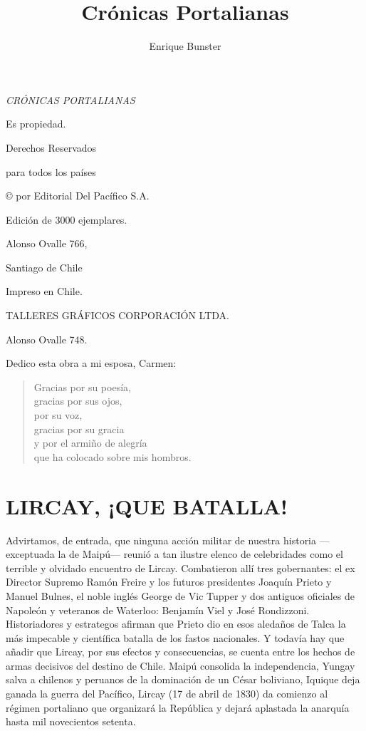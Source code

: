 \documentclass[10pt,twoside,openright]{memoir}
\title{Crónicas Portalianas}
\author{Enrique Bunster}
\makeatletter
\def\maketitle{%
	\null
	\thispagestyle{empty}%
	\vfill
	\begin{center}\leavevmode
		\normalfont
		{\LARGE\raggedleft \@author\par}%
		\hrulefill\par
		{\huge\raggedright \@title\par}%
		\vskip 1cm
	\end{center}%
	\vfill
	\null
	\cleardoublepage
}
\makeatother
\begin{document}
\let\cleardoublepage\clearpage

\maketitle

\frontmatter
\null\vfill
\begin{flushleft}
	\textit{CRÓNICAS PORTALIANAS}
	
	Es propiedad.
	
	Derechos Reservados
	
	para todos los países
	
	© por Editorial Del Pacífico S.A.

	Edición de 3000 ejemplares.
	
	Alonso Ovalle 766,
	
	Santiago de Chile	

	\bigskip
	
	
	Impreso en Chile.
	
	TALLERES GRÁFICOS CORPORACIÓN LTDA.
	
	Alonso Ovalle 748.
	
	
	
	
\end{flushleft}
\let\cleardoublepage\clearpage

\mainmatter
\sloppy


	
Dedico esta obra a mi esposa, Carmen:

\begin{verse}
Gracias por su poesía,\\
gracias por sus ojos,\\
por su voz,\\
gracias por su gracia\\
y por el armiño de alegría\\
que ha colocado sobre mis hombros.
\end{verse}

\chapter{LIRCAY, ¡QUE BATALLA!}

Advirtamos, de entrada, que ninguna acción militar de nuestra historia
---exceptuada la de Maipú--- reunió a tan ilustre elenco de celebridades
como el terrible y olvidado encuentro de Lircay. Combatieron allí tres
gobernantes: el ex Director Supremo Ramón Freire y los futuros
presidentes Joaquín Prieto y Manuel Bulnes, el noble inglés George de
Vic Tupper y dos antiguos oficiales de Napoleón y veteranos de Waterloo:
Benjamín Viel y José Rondizzoni. Historiadores y estrategos afirman que
Prieto dio en esos aledaños de Talca la más impecable y científica
batalla de los fastos nacionales. Y todavía hay que añadir que Lircay,
por sus efectos y consecuencias, se cuenta entre los hechos de armas
decisivos del destino de Chile. Maipú consolida la independencia, Yungay
salva a chilenos y peruanos de la dominación de un César boliviano,
Iquique deja ganada la guerra del Pacífico, Lircay (17 de abril de 1830)
da comienzo al régimen portaliano que organizará la República y dejará
aplastada la anarquía hasta mil novecientos setenta.
\end{document}
